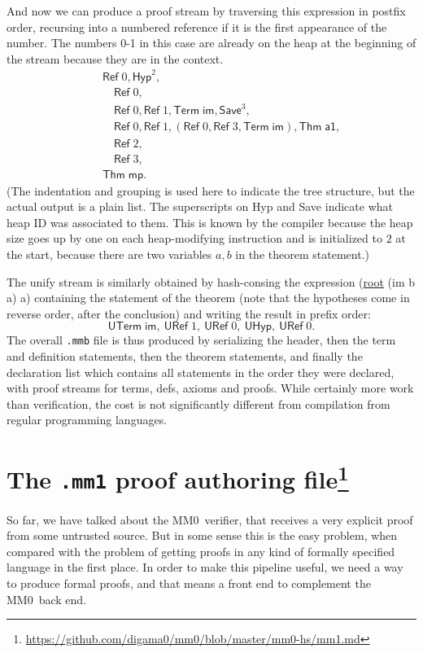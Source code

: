 \documentclass[runningheads]{llncs}
\newcommand{\mmO}{\textsf{MM0}}
\begin{document}
And now we can produce a proof stream by traversing this expression in postfix order, recursing into a numbered reference if it is the first appearance of the number. The numbers 0-1 in this case are already on the heap at the beginning of the stream because they are in the context.
\begin{align*}
  &\quad\mathsf{Ref}\;0,\mathsf{Hyp}^2,\\
  &\quad\quad\mathsf{Ref}\;0,\\
  &\quad\quad\mathsf{Ref}\;0,\mathsf{Ref}\;1,\mathsf{Term}\;\mathsf{im},\mathsf{Save}^3,\\
  &\quad\quad\mathsf{Ref}\;0,\mathsf{Ref}\;1,(\mathsf{Ref}\;0,\mathsf{Ref}\;3,\mathsf{Term}\;\mathsf{im}),\mathsf{Thm}\;\mathsf{a1},\\
  &\quad\quad\mathsf{Ref}\;2,\\
  &\quad\quad\mathsf{Ref}\;3,\\
  &\quad\mathsf{Thm}\;\mathsf{mp}.
\end{align*}
(The indentation and grouping is used here to indicate the tree structure, but the actual output is a plain list. The superscripts on \textsf{Hyp} and \textsf{Save} indicate what heap ID was associated to them. This is known by the compiler because the heap size goes up by one on each heap-modifying instruction and is initialized to $2$ at the start, because there are two variables $a,b$ in the theorem statement.)

The unify stream is similarly obtained by hash-consing the expression \textsf{(\underline{root} (im b a) a)} containing the statement of the theorem (note that the hypotheses come in reverse order, after the conclusion) and writing the result in prefix order:
$$\mathsf{UTerm}\;\mathsf{im},\ \mathsf{URef}\;1,\ \mathsf{URef}\;0,\ \mathsf{UHyp},\ \mathsf{URef}\;0.$$
The overall \texttt{.mmb} file is thus produced by serializing the header, then the term and definition statements, then the theorem statements, and finally the declaration list which contains all statements in the order they were declared, with proof streams for terms, defs, axioms and proofs. While certainly more work than verification, the cost is not significantly different from compilation from regular programming languages.

\section[The \texttt{.mm1} proof authoring file]{The \texttt{.mm1} proof authoring file\footnote{
  \url{https://github.com/digama0/mm0/blob/master/mm0-hs/mm1.md}
  }}\label{sec:mm1}
So far, we have talked about the \mmO\ verifier, that receives a very explicit proof from some untrusted source. But in some sense this is the easy problem, when compared with the problem of getting proofs in any kind of formally specified language in the first place. In order to make this pipeline useful, we need a way to produce formal proofs, and that means a front end to complement the \mmO\ back end.
\end{document}
